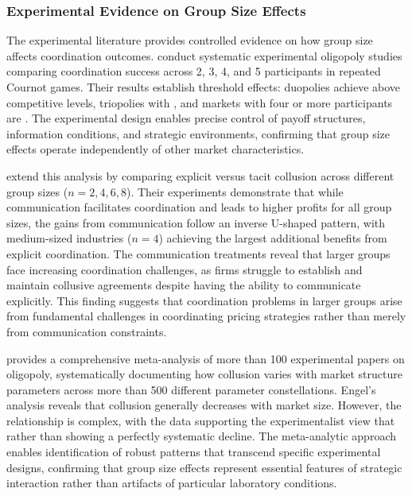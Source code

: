 \subsubsection*{Experimental Evidence on Group Size Effects}

The experimental literature provides controlled evidence on how group size affects coordination outcomes. \textcite{huck_two_2004} conduct systematic experimental oligopoly studies comparing coordination success across 2, 3, 4, and 5 participants in repeated Cournot games. Their results establish threshold effects: duopolies achieve  above competitive levels, triopolies  with , and markets with four or more participants are  \parencite[p. 435]{huck_two_2004}. The experimental design enables precise control of payoff structures, information conditions, and strategic environments, confirming that group size effects operate independently of other market characteristics.

\textcite{fonseca_explicit_2012} extend this analysis by comparing explicit versus tacit collusion across different group sizes ($n=2,4,6,8$). Their experiments demonstrate that while communication facilitates coordination and leads to higher profits for all group sizes, the gains from communication follow an inverse U-shaped pattern, with medium-sized industries ($n=4$) achieving the largest additional benefits from explicit coordination. The communication treatments reveal that larger groups face increasing coordination challenges, as firms struggle to establish and maintain collusive agreements despite having the ability to communicate explicitly. This finding suggests that coordination problems in larger groups arise from fundamental challenges in coordinating pricing strategies rather than merely from communication constraints.

\textcite{engel_how_2007} provides a comprehensive meta-analysis of more than 100 experimental papers on oligopoly, systematically documenting how collusion varies with market structure parameters across more than 500 different parameter constellations. Engel's analysis reveals that collusion generally decreases with market size. However, the relationship is complex, with the data supporting the experimentalist view that  rather than showing a perfectly systematic decline. The meta-analytic approach enables identification of robust patterns that transcend specific experimental designs, confirming that group size effects represent essential features of strategic interaction rather than artifacts of particular laboratory conditions.

